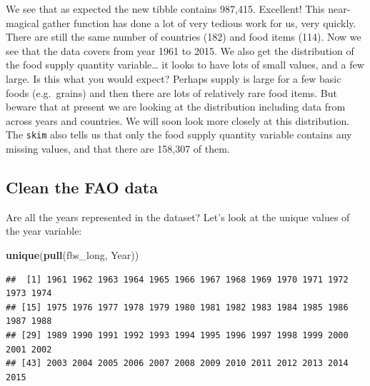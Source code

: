 \documentclass[]{book}
\newenvironment{Shaded}{\begin{snugshade}}{\end{snugshade}}
\newcommand{\CommentTok}[1]{\textcolor[rgb]{0.56,0.35,0.01}{\textit{#1}}}
\newcommand{\DataTypeTok}[1]{\textcolor[rgb]{0.13,0.29,0.53}{#1}}
\newcommand{\DecValTok}[1]{\textcolor[rgb]{0.00,0.00,0.81}{#1}}
\newcommand{\KeywordTok}[1]{\textcolor[rgb]{0.13,0.29,0.53}{\textbf{#1}}}
\newcommand{\NormalTok}[1]{#1}
\newcommand{\OperatorTok}[1]{\textcolor[rgb]{0.81,0.36,0.00}{\textbf{#1}}}
\newcommand{\StringTok}[1]{\textcolor[rgb]{0.31,0.60,0.02}{#1}}
\begin{document}
\begin{Shaded}
\end{Shaded}

We see that as expected the new tibble contains 987,415. Excellent! This near-magical gather function has done a lot of very tedious work for us, very quickly. There are still the same number of countries (182) and food items (114). Now we see that the data covers from year 1961 to 2015. We also get the distribution of the food supply quantity variable\ldots{} it looks to have lots of small values, and a few large. Is this what you would expect? Perhaps supply is large for a few basic foods (e.g.~grains) and then there are lots of relatively rare food items. But beware that at present we are looking at the distribution including data from across years and countries. We will soon look more closely at this distribution. The \texttt{skim} also tells us that only the food supply quantity variable contains any missing values, and that there are 158,307 of them.

\hypertarget{clean-the-fao-data}{%
\subsection{Clean the FAO data}\label{clean-the-fao-data}}

Are all the years represented in the dataset? Let's look at the unique values of the year variable:

\begin{Shaded}
\begin{Highlighting}[]
\KeywordTok{unique}\NormalTok{(}\KeywordTok{pull}\NormalTok{(fbs_long, Year))}
\end{Highlighting}
\end{Shaded}

\begin{verbatim}
##  [1] 1961 1962 1963 1964 1965 1966 1967 1968 1969 1970 1971 1972 1973 1974
## [15] 1975 1976 1977 1978 1979 1980 1981 1982 1983 1984 1985 1986 1987 1988
## [29] 1989 1990 1991 1992 1993 1994 1995 1996 1997 1998 1999 2000 2001 2002
## [43] 2003 2004 2005 2006 2007 2008 2009 2010 2011 2012 2013 2014 2015
\end{verbatim}
\end{document}
